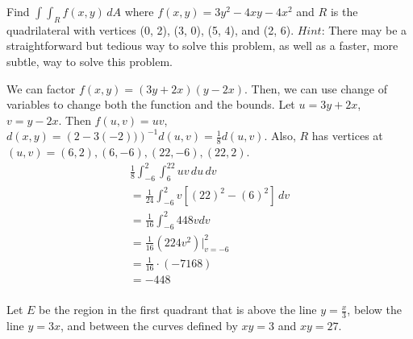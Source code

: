 \documentclass[12pt]{exam}
\begin{document}
\begin{questions}
\question Find $\int\int_R f(x, y)\, dA$ where $f(x, y) = 3y^2 - 4xy - 4x^2$ and $R$ is the quadrilateral with vertices (0, 2), (3, 0), (5, 4), and (2, 6). $Hint$: There may be a straightforward but tedious way to solve this problem, as well as a faster, more subtle, way to solve this problem.
	\begin{solution}
		We can factor $f(x, y) = (3y+2x)(y-2x)$. Then, we can use change of variables to change both the function and the bounds. Let $u = 3y + 2x$, $v = y - 2x$. Then $f(u, v) = uv$, $d(x, y) = \left(2 - 3(-2))\right)^{-1} d(u, v) = \frac{1}{8}d(u, v)$. Also, $R$ has vertices at $(u, v) = (6, 2), (6, -6), (22, -6), (22, 2)$.\\
		\begin{gather*}
			\frac{1}{8} \int_{-6}^{2} \int_{6}^{22} uv \, du\, dv \\
			= \frac{1}{24} \int_{-6}^{2} v \left[\left(22\right)^2 - \left(6\right)^2 \right]\, dv \\
			= \frac{1}{16} \int_{-6}^{2} 448 v dv \\
			= \frac{1}{16} \left(224 v^2\right)|_{v=-6}^{2} \\
			= \frac{1}{16} \cdot (-7168) \\
			= \boxed{- 448} \\
		\end{gather*}
	\end{solution}
\question Let $E$ be the region in the ﬁrst quadrant that is above the line $y = \frac{x}{3}$, below the line $y = 3x$, and
between the curves deﬁned by $xy = 3$ and $xy = 27$.
\end{questions}
\end{document}
